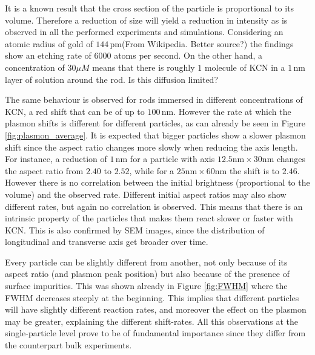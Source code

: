 \documentclass{article}
\begin{document}
It is a known result that the cross section of the particle is proportional to
its volume. Therefore a reduction of size will yield a reduction in intensity
as is observed in all the performed experiments and simulations. Considering an
atomic radius of gold of $144\,\textrm{pm}$(From Wikipedia. Better source?) the
findings show an etching rate of $6000$ atoms per second. On the other hand, a
concentration of $30\mu M$ means that there is roughly $1$ molecule of KCN in a
$1\,\textrm{nm}$ layer of solution around the rod. Is this diffusion limited? 

The same behaviour is observed for rods immersed in different concentrations of
KCN, a red shift that can be of up to $100\,\textrm{nm}$. However the rate at
which the plasmon shifts is different for different particles, as can already be
seen in Figure \ref{fig:plasmon_average}. It is expected that bigger particles
show a slower plasmon shift since the aspect ratio changes more slowly when
reducing the axis length. For instance, a reduction of $1\,\textrm{nm}$ for a
particle with axis $12.5\textrm{nm}\times30\textrm{nm}$ changes the aspect ratio
from  $2.40$ to $2.52$, while for a $25\textrm{nm}\times60\textrm{nm}$ the shift
is to $2.46$. However there is no correlation between the initial brightness
(proportional to the volume) and the observed rate. Different initial aspect
ratios may also show different rates, but again no correlation is observed. This
means that there is an intrinsic property of the particles that makes them react
slower or faster with KCN. This is also confirmed by SEM images, since the
distribution of longitudinal and transverse axis get broader over time.

Every particle can be slightly different from another, not only because of its
aspect ratio (and plasmon peak position) but also because of the presence of
surface impurities. This was shown already in Figure \ref{fig:FWHM} where the
FWHM decreases steeply at the beginning. This implies that different particles
will have slightly different reaction rates, and moreover the effect on the
plasmon may be greater, explaining the different shift-rates. All this
observations at the single-particle level prove to be of fundamental importance 
since they differ from the counterpart bulk experiments. 
\end{document}
